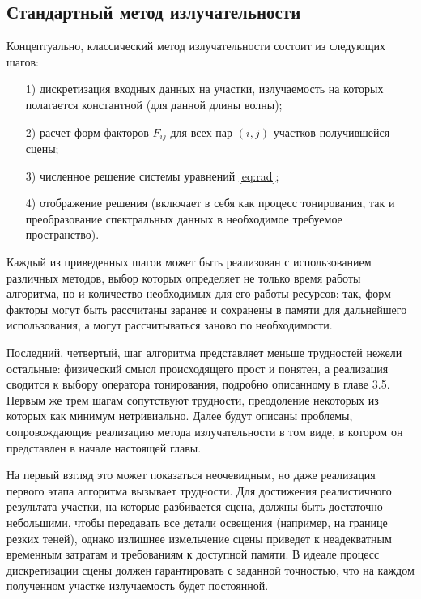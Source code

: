 \documentclass[12pt]{article}
\begin{document}
\subsection{Стандартный метод излучательности}
Концептуально, классический метод излучательности состоит из следующих шагов:
\begin{enumerate}
\item[1)] дискретизация входных данных на участки, излучаемость на которых полагается константной (для данной длины волны);
\item[2)] расчет форм-факторов $F_{ij}$ для всех пар $(i, j)$ участков получившейся сцены;
\item[3)] численное решение системы уравнений \eqref{eq:rad};
\item[4)] отображение решения (включает в себя как процесс тонирования, так и преобразование спектральных данных в необходимое требуемое пространство).
\end{enumerate}

Каждый из приведенных шагов может быть реализован с использованием различных методов, выбор которых определяет не только время работы алгоритма, но и количество необходимых для его работы ресурсов: так, форм-факторы могут быть рассчитаны заранее и сохранены в памяти для дальнейшего использования, а могут рассчитываться заново по необходимости.

Последний, четвертый, шаг алгоритма представляет меньше трудностей нежели остальные: физический смысл происходящего прост и понятен, а реализация сводится к выбору оператора тонирования, подробно описанному в главе 3.5. Первым же трем шагам сопутствуют трудности, преодоление некоторых из которых как минимум нетривиально. Далее будут описаны проблемы, сопровождающие реализацию метода излучательности в том виде, в котором он представлен в начале настоящей главы.

На первый взгляд это может показаться неочевидным, но даже реализация первого этапа алгоритма вызывает трудности. Для достижения реалистичного результата участки, на которые разбивается сцена, должны быть достаточно небольшими, чтобы передавать все детали освещения (например, на границе резких теней), однако излишнее измельчение сцены приведет к неадекватным временным затратам и требованиям к доступной памяти. В идеале процесс дискретизации сцены должен гарантировать с заданной точностью, что на каждом полученном участке излучаемость будет постоянной.
\end{document}
